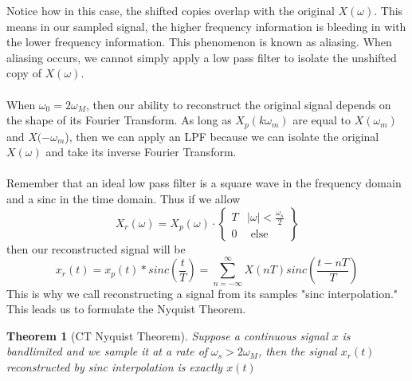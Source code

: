 \documentclass{article}
\newtheorem{theorem}{Theorem}
\begin{document}
\begin{figure}[H]
    \centering
\end{figure}
Notice how in this case, the shifted copies overlap with the original $X(\omega)$. This means in our sampled signal, the higher frequency
information is bleeding in with the lower frequency information. This phenomenon is known as aliasing. When aliasing occurs, we cannot simply
apply a low pass filter to isolate the unshifted copy of $X(\omega)$.\\\\
When $\omega_0 = 2\omega_M$, then our ability to reconstruct the original signal depends on the shape of its Fourier Transform. As long as $X_p(k\omega_m)$
are equal to $X(\omega_m)$ and $X(-\omega_m$), then we can apply an LPF because we can isolate the original $X(\omega)$ and take its inverse Fourier Transform.\\\\
Remember that an ideal low pass filter is a square wave in the frequency domain and a sinc in the time domain. Thus if we allow
\[
    X_r(\omega) = X_p(\omega)\cdot \left\{
            \begin{array}{cc}
                T & |\omega| < \frac{\omega_s}{2}\\
                0 & \text{ else }
            \end{array}
        \right\}
\]
then our reconstructed signal will be
$$x_r(t) = x_p(t)*sinc\left(\frac{t}{T}\right) = \sum_{n=-\infty}^{\infty}{X(nT)sinc\left(\frac{t-nT}{T}\right)}$$
This is why we call reconstructing a signal from its samples "sinc interpolation."
This leads us to formulate the Nyquist Theorem.
\begin{theorem}[CT Nyquist Theorem]
    Suppose a continuous signal $x$ is bandlimited and we sample it at a rate of $\omega_s > 2\omega_M$, then the signal $x_r(t)$
    reconstructed by sinc interpolation is exactly $x(t)$
\end{theorem}
\end{document}
